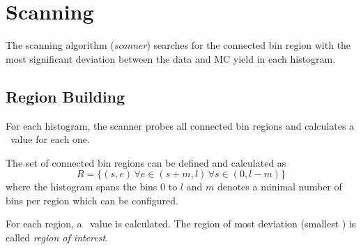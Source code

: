 
\section{Scanning}
The scanning algorithm (\emph{scanner}) searches for the connected bin region with the most significant deviation between the data and MC yield in each histogram.

\subsection{Region Building}
For each histogram, the scanner probes all connected bin regions and calculates a \p~value for each one.

The set of connected bin regions can be defined and calculated as
\begin{equation}
R = \{(s, e) \, \forall e \in (s + m, l) \, \forall s \in (0, l-m)\}
\end{equation}
where the histogram spans the bins $0$ to $l$ and $m$ denotes a minimal number of bins per region which can be configured.

For each region, a \p~value is calculated. The region of most deviation (smallest \p) is called \emph{region of interest}.

